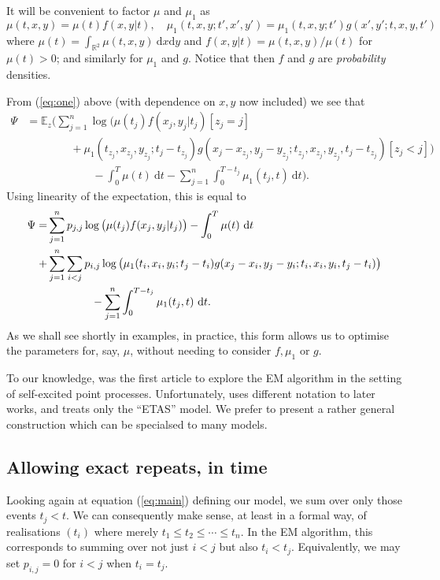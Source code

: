 \documentclass[twoside,a4paper]{article}
\theoremstyle{plain}
\theoremstyle{definition}
\newcommand{\rd}{\textrm{d}}
\begin{document}
It will be convenient to factor $\mu$ and $\mu_1$ as
\[ \mu(t,x,y) = \mu(t) f(x,y|t), \quad \mu_1(t,x,y;t',x',y')
= \mu_1(t,x,y;t') g(x',y';t,x,y,t') \]
where $\mu(t) = \int_{\mathbb R^2} \mu(t,x,y) \ \rd x \rd y$ and $f(x,y|t) = \mu(t,x,y) / \mu(t)$ for
$\mu(t)>0$; and similarly for $\mu_1$ and $g$.  Notice that then $f$ and $g$ are
\emph{probability} densities.  

From (\ref{eq:one}) above (with dependence on $x,y$ now included) we see that
\begin{align*} \Psi &= \mathbb E_z\Big(
\sum_{j=1}^n \log \big( \mu(t_j)f(x_j,y_j|t_j)[z_j=j]
	\\ &\qquad\qquad + \mu_1(t_{z_j},x_{z_j},y_{z_j};t_j - t_{z_j})
	g(x_j - x_{z_j},y_j - y_{z_j}; t_{z_j},x_{z_j},y_{z_j},t_j - t_{z_j}) [z_j<j] \big)
\\ &\qquad\qquad\qquad
-\int_0^T \mu(t) \ \rd t - \sum_{j=1}^n\int_{0}^{T-t_j} \mu_1(t_j, t) \ \rd t
\Big).
\end{align*}
Using linearity of the expectation, this is equal to
\begin{align}
\Psi=&\sum_{j=1}^n p_{j,j} \log \big( \mu(t_j)f(x_j,y_j|t_j)\big)
    - \int_0^T \mu(t) \ \rd t \notag\\
+ &\sum_{j=1}^n \sum_{i<j} p_{i,j}
	\log\big(\mu_1(t_i,x_i,y_i;t_j - t_i)
	g(x_j - x_i,y_j - y_i; t_i,x_i,y_i,t_j - t_i) \big)
\notag\\ & \qquad\qquad
- \sum_{j=1}^n\int_{0}^{T-t_j} \mu_1(t_j, t) \ \rd t. \label{eq:two}
\end{align}
As we shall see shortly in examples, in practice, this form allows us to optimise
the parameters for, say, $\mu$, without needing to consider $f,\mu_1$ or $g$.

To our knowledge, \cite{vs} was the first article to explore the EM algorithm in
the setting of self-excited point processes.  Unfortunately, \cite{vs} uses different
notation to later works, and treats only the ``ETAS'' model.  We prefer to present
a rather general construction which can be specialsed to many models.


\subsection{Allowing exact repeats, in time}\label{app:exact_repeats_in_time}

Looking again at equation (\ref{eq:main}) defining our model, we sum over only those
events $t_j<t$.  We can consequently make sense, at least in a formal way, of
realisations $(t_i)$ where merely $t_1 \leq t_2 \leq \cdots \leq t_n$.  In the EM
algorithm, this corresponds to summing over not just $i<j$ but also $t_i < t_j$.
Equivalently, we may set $p_{i,j}=0$ for $i<j$ when $t_i = t_j$.
\end{document}
